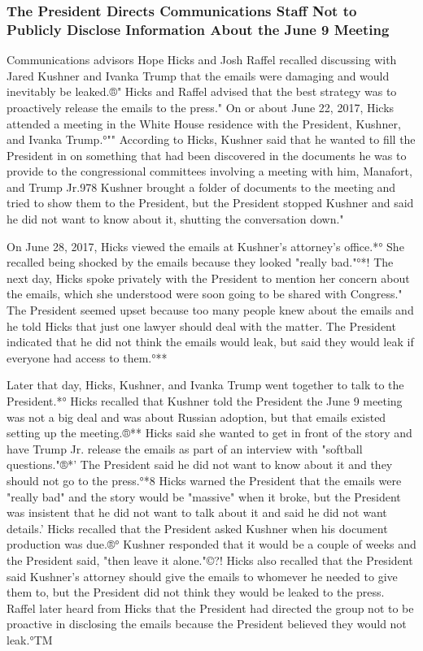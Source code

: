\subsubsection{The President Directs Communications Staff Not to Publicly Disclose Information About the June 9 Meeting}

Communications advisors Hope Hicks and Josh Raffel recalled discussing with Jared Kushner and Ivanka Trump that the emails were damaging and would inevitably be leaked.®"
Hicks and Raffel advised that the best strategy was to proactively release the emails to the press."
On or about June 22, 2017, Hicks attended a meeting in the White House residence with the President, Kushner, and Ivanka Trump.°""
According to Hicks, Kushner said that he wanted to fill the President in on something that had been discovered in the documents he was to provide to the congressional committees involving a meeting with him, Manafort, and Trump Jr.978
Kushner brought a folder of documents to the meeting and tried to show them to the President, but the President stopped Kushner and said he did not want to know about it, shutting the conversation down."

On June 28, 2017, Hicks viewed the emails at Kushner's attorney's office.*°
She recalled being shocked by the emails because they looked "really bad."°*!
The next day, Hicks spoke privately with the President to mention her concern about the emails, which she understood were soon going to be shared with Congress."
The President seemed upset because too many people knew about the emails and he told Hicks that just one lawyer should deal with the matter.
The President indicated that he did not think the emails would leak, but said they would leak if everyone had access to them.°**

Later that day, Hicks, Kushner, and Ivanka Trump went together to talk to the President.*°
Hicks recalled that Kushner told the President the June 9 meeting was not a big deal and was about Russian adoption, but that emails existed setting up the meeting.®**
Hicks said she wanted to get in front of the story and have Trump Jr. release the emails as part of an interview with "softball questions."®*'
The President said he did not want to know about it and they should not go to the press.°*8
Hicks warned the President that the emails were "really bad" and the story would be "massive" when it broke, but the President was insistent that he did not want to talk about it and said he did not want details.'
Hicks recalled that the President asked Kushner when his document production was due.®°
Kushner responded that it would be a couple of weeks and the President said, "then leave it alone."©?!
Hicks also recalled that the President said Kushner's attorney should give the emails to whomever he needed to give them to, but the President did not think they would be leaked to the press.
Raffel later heard from Hicks that the President had directed the group not to be proactive in disclosing the emails because the President believed they would not leak.°TM

